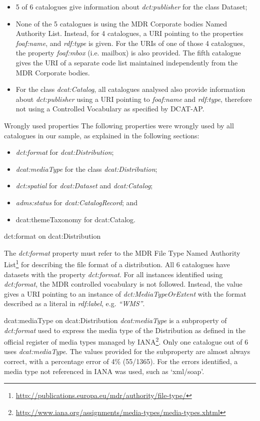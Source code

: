 \documentclass[<options>]{elsarticle}
\begin{document}
\begin{itemize}
\item 5 of 6 catalogues give information about \textit{dct:publisher} for the class Dataset;
\item None of the 5 catalogues is using the MDR Corporate bodies Named Authority List. Instead, for 4 catalogues, a URI pointing to the properties \textit{foaf:name}, and \textit{rdf:type} is given. For the URIs of one of those 4 catalogues, the property \textit{foaf:mbox} (i.e. mailbox) is also provided. The fifth catalogue gives the URI of a separate code list maintained independently from the MDR Corporate bodies.
\item For the class \textit{dcat:Catalog}, all catalogues analysed also provide information about \textit{dct:publisher} using a URI pointing to \textit{foaf:name} and \textit{rdf:type}, therefore not using a Controlled Vocabulary as specified by DCAT-AP.
\end{itemize}

Wrongly used properties
The following properties were wrongly used by all catalogues in our sample, as explained in the following sections: 
\begin{itemize}
\item \textit{dct:format} for \textit{dcat:Distribution};
\item \textit{dcat:mediaType} for the class \textit{dcat:Distribution}; 
\item \textit{dct:spatial} for \textit{dcat:Dataset} and \textit{dcat:Catalog}; 
\item \textit{adms:status} for \textit{dcat:CatalogRecord}; and 
\item dcat:themeTaxonomy for dcat:Catalog.
\end{itemize}

dct:format on dcat:Distribution

The \textit{dct:format} property must refer to the MDR File Type Named Authority List\footnote{\href{    http://publications.europa.eu/mdr/authority/file-type/}{        http://publications.europa.eu/mdr/authority/file-type/}} for describing the file format of a distribution. All 6 catalogues have datasets with the property \textit{dct:format}. For all instances identified using \textit{dct:format}, the MDR controlled vocabulary is not followed. Instead, the 
value gives a URI pointing to an instance of \textit{dct:MediaTypeOrExtent} with the format described as a literal in \textit{rdf:label}, e.g. \textit{“WMS”}.

dcat:mediaType on dcat:Distribution
\textit{dcat:mediaType }is a subproperty of \textit{dct:format} used to express the media type of the Distribution as defined in the official register of media types managed by IANA\footnote{\href{     http://www.iana.org/assignments/media-types/media-types.xhtml}{         http://www.iana.org/assignments/media-types/media-types.xhtml}}. Only one catalogue out of 6 uses \textit{dcat:mediaType}. The values provided for the subproperty are almost always correct, with a percentage error of 4\% (55/1365). For the errors identified, a media type not referenced in IANA was used, such as ‘xml/soap’.
\end{document}
